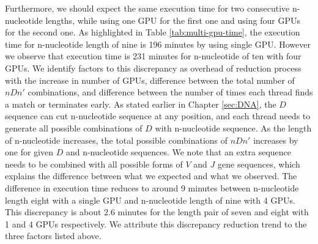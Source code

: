 Furthermore, we should expect the same execution time for two consecutive n-nucleotide lengths, while using one GPU for the first one and using four GPUs for the second one. As highlighted in Table \ref{tab:multi-gpu-time}, the execution time for n-nucleotide length of nine is 196 minutes by using single GPU. However we observe that execution time is 231 minutes for n-nucleotide of ten with four GPUs. We identify factors to this discrepancy as overhead of reduction process with the increase in number of GPUs, difference between the total number of $nDn'$ combinations, and difference between the number of times each thread finds a match or terminates early. As stated earlier in Chapter \ref{sec:DNA}, the $D$ sequence can cut n-nucleotide sequence at any position, and each thread needs to generate all possible combinations of $D$ with n-nucleotide sequence. As the length of n-nucleotide increases, the total possible combinations of $nDn'$ increases by one for given $D$ and n-nucleotide sequences. We note that an extra sequence needs to be combined with all possible forms of $V$ and $J$ gene sequences, which explains the difference between what we expected and what we observed. The difference in execution time reduces to around 9 minutes between n-nucleotide length eight with a single GPU and n-nucleotide length of nine with 4 GPUs. This discrepancy is about 2.6 minutes for the length pair of seven and eight with 1 and 4 GPUs respectively. We attribute this discrepancy reduction trend to the three factors listed above. 
  
